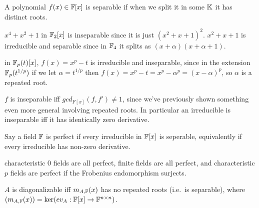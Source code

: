 \documentclass[11pt]{article}
\begin{document}
\begin{definition}
  A polynomial $f(x) \in \mathbb{F}[x]$ is separable if when we split it in some $\mathbb{K}$ it has distinct roots.
\end{definition}
\begin{example}
  $x^4 + x^2 + 1$ in $\mathbb{F}_2[x]$ is inseparable since it is just $(x^2 + x + 1)^2$. $x^2 + x + 1$ is irreducible and separable since in $\mathbb{F}_4$ it splits as $(x + \alpha)(x + \alpha + 1)$.
\end{example}
\begin{example}
  in $\mathbb{F}_p(t)[x]$, $f(x) = x^p - t$ is irreducible and inseparable, since in the extension $\mathbb{F}_p(t^{1/p})$ if we let $\alpha = t^{1/p}$ then $f(x) = x^p - t = x^p - \alpha^p = (x - \alpha)^p$, so $\alpha$ is a repeated root.
\end{example}
\begin{remark}
  $f$ is inseparable iff $gcd_{F[x]}(f,f') \ne 1$, since we've previously shown something even more general involving repeated roots. In particular an irreducible is inseparable iff it has identically zero derivative.
\end{remark}

\begin{definition}
  Say a field $\mathbb{F}$ is perfect if every irreducible in $\mathbb{F}[x]$ is seperable, equivalently if every irreducible has non-zero derivative.
\end{definition}
\begin{remark}
  characteristic $0$ fields are all perfect, finite fields are all perfect, and characteristic $p$ fields are perfect if the Frobenius endomorphism surjects.
\end{remark}

\begin{remark}[HW 13.6.9]
  $A$ is diagonalizable iff $m_{A,\mathbb{F}}(x)$ has no repeated roots (i.e.\ is separable), where $(m_{A,\mathbb{F}}(x)) = \ker(ev_A : \mathbb{F}[x] \rightarrow \mathbb{F}^{n \times n})$. 
\end{remark}
\end{document}
